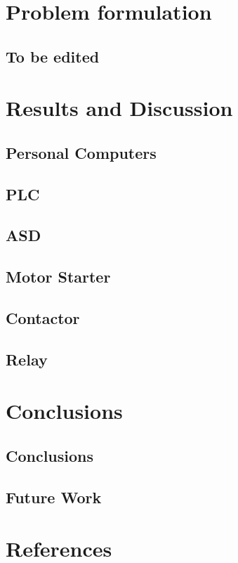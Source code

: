 \documentclass[14pt, a4paper]{extreport}
\begin{document}
	
	\chapter[Problem formulation]{Problem formulation}
		\section{To be edited}
	
	\chapter[Results and Discussion]{Results and Discussion}
		\section{Personal Computers}
		\section{PLC}
		\section{ASD}
		\section{Motor Starter}
		\section{Contactor}
		\section{Relay}
	
	\chapter[Conclusions and future work]{Conclusions}
		\section{Conclusions}
		\section{Future Work}
	
	\chapter[References]{References}
		
	
		
\end{document}
